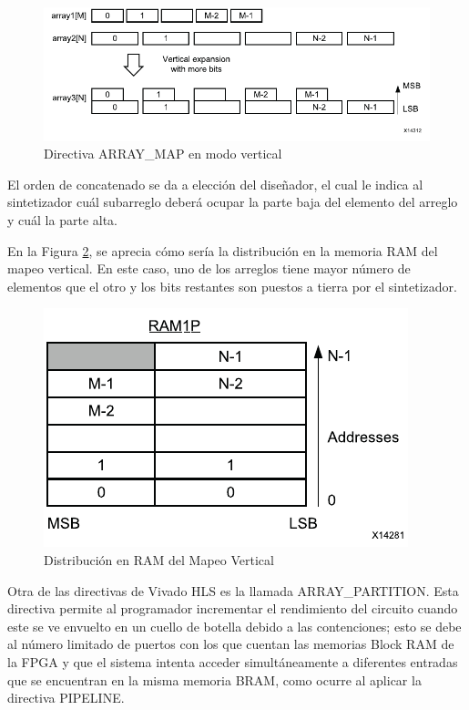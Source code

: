 \begin{figure}[H]
	\centering
		\includegraphics[scale=0.8]{./Figures/HLS8.pdf}
	\caption{Directiva ARRAY\_MAP en modo vertical \citep{HLS2015}}
	\label{fig:HLS8}
\end{figure}

El orden de concatenado se da a elección del diseñador, el cual le indica al sintetizador cuál subarreglo deberá ocupar la parte baja del elemento del arreglo y cuál la parte alta.

En la Figura \ref{fig:HLS11}, se aprecia cómo sería la distribución en la memoria RAM del mapeo vertical. En este caso, uno de los arreglos tiene mayor número de elementos que el otro y los bits restantes son puestos a tierra por el sintetizador.

\begin{figure}[H]
	\centering
		\includegraphics[scale=0.8]{./Figures/HLS11.pdf}
	\caption{Distribución en RAM del Mapeo Vertical  \citep{HLS2015}}
	\label{fig:HLS11}
\end{figure}

Otra de las directivas de Vivado HLS es la llamada ARRAY\_PARTITION. Esta directiva permite al programador incrementar el rendimiento del circuito cuando este se ve envuelto en un cuello de botella debido a las contenciones; esto se debe al número limitado de puertos con los que cuentan las memorias Block RAM de la FPGA y que el sistema intenta acceder simultáneamente a diferentes entradas que se encuentran en la misma memoria BRAM, como ocurre al aplicar la directiva PIPELINE.

